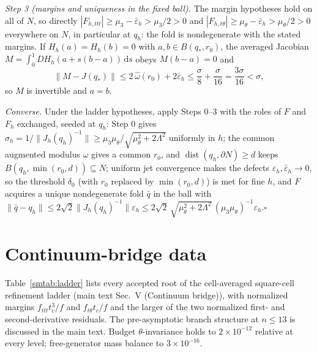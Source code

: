\documentclass[aps,pre,reprint,amsmath,amssymb,longbibliography,floatfix]{revtex4-2}
\newcommand{\dd}{\mathrm d}
\begin{document}
\emph{Step 3 (margins and uniqueness in the fixed ball).} The margin
hypotheses hold on all of \(N\), so directly
\(|F_{h,ttt}|\ge\mu_3-\bar\varepsilon_h>\mu_3/2>0\) and
\(|F_{h,t\theta}|\ge\mu_\theta-\bar\varepsilon_h>\mu_\theta/2>0\)
everywhere on \(N\), in particular at \(q_h\): the fold is nondegenerate
with the stated margins. If \(H_h(a)=H_h(b)=0\) with
\(a,b\in B(q_*,r_0)\), the averaged Jacobian
\(M=\int_0^1DH_h(a+s(b-a))\,\dd s\) obeys \(M(b-a)=0\) and
\[
\|M-J(q_*)\|\le2\,\hat\omega(r_0)+2\bar\varepsilon_h
\le\frac\sigma8+\frac\sigma{16}=\frac{3\sigma}{16}<\sigma,
\]
so \(M\) is invertible and \(a=b\).

\emph{Converse.} Under the ladder hypotheses, apply Steps 0--3 with the
roles of \(F\) and \(F_h\) exchanged, seeded at \(q_h\): Step 0 gives
\(\sigma_h=1/\|J_h(q_h)^{-1}\|\ge
\mu_3\mu_\theta/\sqrt{\mu_\theta^2+2\Lambda^2}\) uniformly in \(h\); the
common augmented modulus \(\hat\omega\) gives a common \(r_0\), and
\(\operatorname{dist}(q_h,\partial N)\ge d\) keeps
\(B(q_h,\min(r_0,d))\subseteq N\); uniform jet convergence makes the
defects \(\varepsilon_h,\bar\varepsilon_h\to0\), so the threshold
\(\delta_0\) (with \(r_0\) replaced by \(\min(r_0,d)\)) is met for fine
\(h\), and \(F\) acquires a unique nondegenerate fold \(\bar q\) in the
ball with
\(\|\bar q-q_h\|\le2\sqrt2\|J_h(q_h)^{-1}\|\varepsilon_h
\le2\sqrt2\,\sqrt{\mu_\theta^2+2\Lambda^2}\,(\mu_3\mu_\theta)^{-1}
\varepsilon_h\).\hfill\(\square\)

\section{Continuum-bridge data}
\label{sm:bridge-data}

Table~\ref{smtab:ladder} lists every accepted root of the cell-averaged
square-cell refinement ladder (main text Sec.~V (Continuum bridge)), with normalized margins
\(f_{ttt}t_c^3/f\) and \(f_{t\theta}t_c/f\) and the larger of the two
normalized first- and second-derivative residuals. The pre-asymptotic
branch structure at \(n\le13\) is discussed in the main text. Budget
\(\theta\)-invariance holds to \(2\times10^{-12}\) relative at every
level; free-generator mass balance to \(3\times10^{-16}\).
\end{document}
